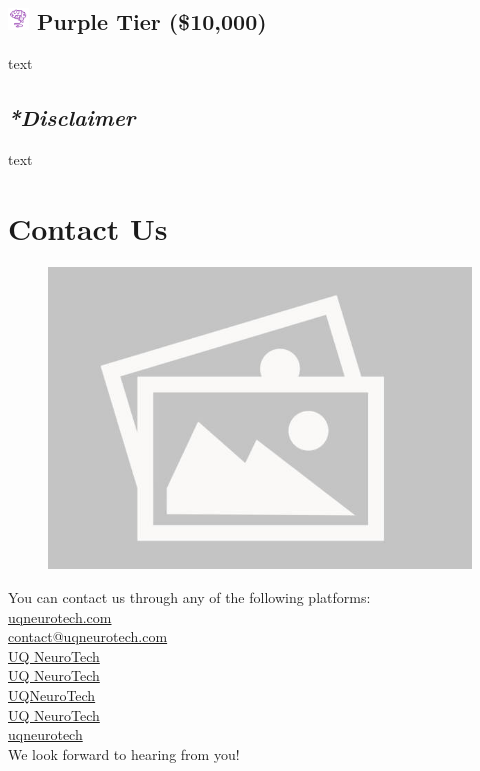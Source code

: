 \documentclass[a4paper,12pt]{report}
\begin{document}
\subsection*{
    \includegraphics[width=1em]{./photos/logo.png}
    \textcolor{turbo_purple}{Purple Tier (\$10,000)}
}
text


\subsection{\textit{*Disclaimer}}
text
\newpage

\section*{Contact Us}
\begin{figure}[H]
    \centering
    \includegraphics[width=0.9\linewidth]{./photos/placeholder.jpg}
\end{figure}

\large
\onehalfspacing
You can contact us through any of the following platforms: \\
\faLink{} \href{https://uqneurotech.com}{uqneurotech.com} \\
\faEnvelope{} \href{mailto:contact@uqneurotech.com}{contact@uqneurotech.com} \\
\faFacebookSquare{} \href{https://www.facebook.com/uqneurotech}{UQ NeuroTech} \\
\faLinkedinSquare{} \href{https://www.linkedin.com/company/uq-neurotech/}{UQ NeuroTech} \\
\faGithubSquare{} \href{https://github.com/UQNeuroTech}{UQNeuroTech} \\
\faYoutubePlay{} \href{https://www.youtube.com/@UQNeuroTech}{UQ NeuroTech} \\
\faInstagram{} \href{https://www.instagram.com/uqneurotech/}{uqneurotech} \\
We look forward to hearing from you!
\end{document}
